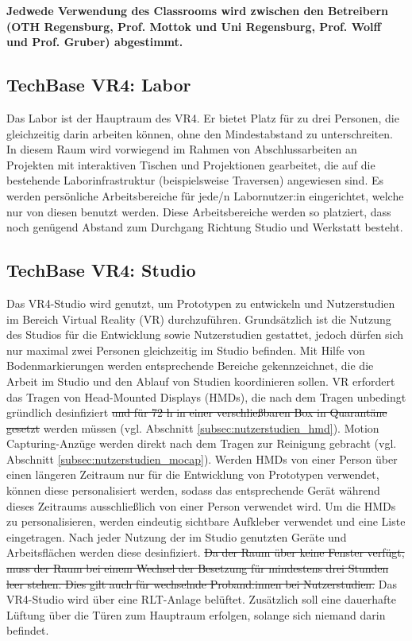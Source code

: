 \noindent
\textbf{Jedwede Verwendung des Classrooms wird zwischen den Betreibern (OTH Regensburg, Prof. Mottok und Uni Regensburg, Prof. Wolff und Prof. Gruber) abgestimmt.}

\subsection{TechBase VR4: Labor}\label{subsec:labore_vr4_labor}


\noindent
Das Labor ist der Hauptraum des VR4. Er bietet Platz für zu drei Personen, die gleichzeitig darin arbeiten können, ohne den Mindestabstand zu unterschreiten. In diesem Raum wird vorwiegend im Rahmen von Abschlussarbeiten an Projekten mit interaktiven Tischen und Projektionen gearbeitet, die auf die bestehende Laborinfrastruktur (beispielsweise Traversen) angewiesen sind.
Es werden persönliche Arbeitsbereiche für jede/n Labornutzer:in eingerichtet, welche nur von diesen benutzt werden.
Diese Arbeitsbereiche werden so platziert, dass noch genügend Abstand zum Durchgang Richtung Studio und Werkstatt besteht.

\subsection{TechBase VR4: Studio}\label{subsec:labore_vr4_stuio}


\noindent
Das VR4-Studio wird genutzt, um Prototypen zu entwickeln und Nutzerstudien im Bereich Virtual Reality (VR) durchzuführen.
Grundsätzlich ist die Nutzung des Studios für die Entwicklung sowie Nutzerstudien gestattet, jedoch dürfen sich nur maximal zwei Personen gleichzeitig im Studio befinden.
Mit Hilfe von Bodenmarkierungen werden entsprechende Bereiche gekennzeichnet, die die Arbeit im Studio und den Ablauf von Studien koordinieren sollen.
VR erfordert das Tragen von Head-Mounted Displays (HMDs), die nach dem Tragen unbedingt gründlich desinfiziert \sout{und für 72 h in einer verschließbaren Box in Quarantäne gesetzt} werden müssen (vgl. Abschnitt \ref{subsec:nutzerstudien_hmd}).
Motion Capturing-Anzüge werden direkt nach dem Tragen zur Reinigung gebracht (vgl. Abschnitt \ref{subsec:nutzerstudien_mocap}).
Werden HMDs von einer Person über einen längeren Zeitraum nur für die Entwicklung von Prototypen verwendet, können diese personalisiert werden, sodass das entsprechende Gerät während dieses Zeitraums ausschließlich von einer Person verwendet wird.
Um die HMDs zu personalisieren, werden eindeutig sichtbare Aufkleber verwendet und eine Liste eingetragen.
Nach jeder Nutzung der im Studio genutzten Geräte und Arbeitsflächen werden diese desinfiziert.
\sout{Da der Raum über keine Fenster verfügt, muss der Raum bei einem Wechsel der Besetzung für mindestens drei Stunden leer stehen. Dies gilt auch für wechselnde Proband:innen bei Nutzerstudien.}
Das VR4-Studio wird über eine RLT-Anlage belüftet.
Zusätzlich soll eine dauerhafte Lüftung über die Türen zum Hauptraum erfolgen, solange sich niemand darin befindet.

